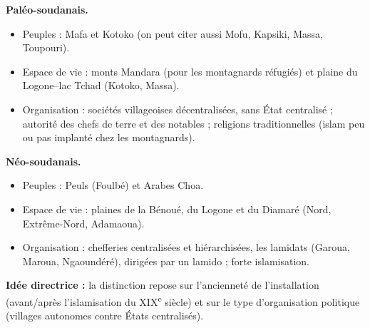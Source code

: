 \documentclass[11pt]{article}
\newcommand{\cle}[1]{{\popxbold\color{popdark}#1}}
\begin{document}
\begin{corrige}
\textbf{Paléo-soudanais.}
\begin{itemize}
\item Peuples : Mafa et Kotoko (on peut citer aussi Mofu, Kapsiki, Massa, Toupouri).
\item Espace de vie : monts Mandara (pour les montagnards réfugiés) et plaine du Logone--lac Tchad (Kotoko, Massa).
\item Organisation : sociétés villageoises décentralisées, sans État centralisé ; autorité des chefs de terre et des notables ; religions traditionnelles (islam peu ou pas implanté chez les montagnards).
\end{itemize}
\textbf{Néo-soudanais.}
\begin{itemize}
\item Peuples : Peuls (Foulbé) et Arabes Choa.
\item Espace de vie : plaines de la Bénoué, du Logone et du Diamaré (Nord, Extrême-Nord, Adamaoua).
\item Organisation : chefferies centralisées et hiérarchisées, les \cle{lamidats} (Garoua, Maroua, Ngaoundéré), dirigées par un lamido ; forte islamisation.
\end{itemize}
\textbf{Idée directrice :} la distinction repose sur l'ancienneté de l'installation (avant/après l'islamisation du XIX\textsuperscript{e} siècle) et sur le type d'organisation politique (villages autonomes contre États centralisés).
\end{corrige}
\end{document}
